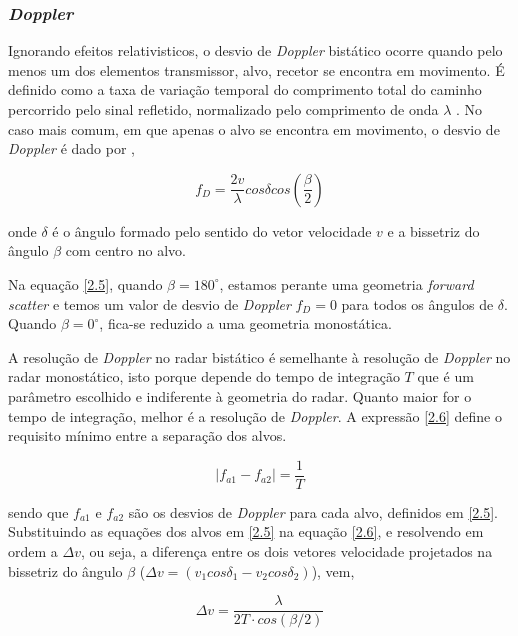 \subsubsection*{\textit{Doppler}} 
Ignorando efeitos relativisticos, o desvio de \textit{Doppler} bistático ocorre quando pelo menos um dos elementos transmissor, alvo, recetor se encontra em movimento. É definido como a taxa de variação temporal do comprimento total do caminho percorrido pelo sinal refletido, normalizado pelo comprimento de onda $\lambda$ \parencite{Willis2005}.  No caso mais comum, em que apenas o alvo se encontra em movimento, o desvio de \textit{Doppler} é dado por \parencite{Willis2005},

\begin{equation} \label{2.5}
f_{D}=\dfrac{2v}{\lambda}cos\delta cos\left( \dfrac{\beta}{2}\right) 
\end{equation}

onde $\delta$ é o ângulo formado pelo sentido do vetor velocidade $v$ e a bissetriz do ângulo $\beta$ com centro no alvo. \par

Na equação \ref{2.5}, quando $\beta =180^{\circ}$, estamos perante uma geometria \textit{forward scatter} e temos um valor de desvio de \textit{Doppler} $f_{D}=0$ para todos os ângulos de $\delta$. Quando $\beta =0^{\circ}$, fica-se reduzido a uma geometria monostática. 


A resolução de \textit{Doppler} no radar bistático é semelhante à resolução de \textit{Doppler} no radar monostático, isto porque depende do tempo de integração $T$ que é um parâmetro escolhido e indiferente à geometria do radar. Quanto maior for o tempo de integração, melhor é a resolução de \textit{Doppler}. A expressão \ref{2.6} define o requisito mínimo entre a separação dos alvos.

\begin{equation} \label{2.6}
\vert f_{a1}-f_{a2}\vert = \dfrac{1}{T}
\end{equation}

sendo que $f_{a1}$ e $f_{a2}$ são os desvios de \textit{Doppler} para cada alvo, definidos em \ref{2.5}. Substituindo as equações dos alvos em \ref{2.5} na equação \ref{2.6}, e resolvendo em ordem a $\Delta v$, ou seja, a diferença entre os dois vetores velocidade projetados na bissetriz do ângulo $\beta$ ($\Delta v=\left( v_{1}cos\delta_{1}-v_{2}cos\delta_{2}\right) $), vem,

\begin{equation} \label{2.7}
\Delta v = \dfrac{\lambda}{2T\cdot cos\left( \beta /2\right) }
\end{equation}

